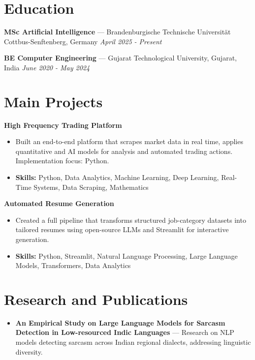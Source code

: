\documentclass[a4paper,10pt]{article}
\begin{document}
\section*{Education}
\textbf{MSc Artificial Intelligence} — Brandenburgische Technische Universität Cottbus-Senftenberg, Germany \hfill \textit{April 2025 - Present}\par
\vspace{1.5pt}
\textbf{BE Computer Engineering} — Gujarat Technological University, Gujarat, India \hfill \textit{June 2020 - May 2024}\par

\section*{Main Projects}
\textbf{High Frequency Trading Platform}\par
\vspace{1pt}
\begin{itemize}
  \item Built an end-to-end platform that scrapes market data in real time, applies quantitative and AI models for analysis and automated trading actions. Implementation focus: Python.
  \item \textbf{Skills:} Python, Data Analytics, Machine Learning, Deep Learning, Real-Time Systems, Data Scraping, Mathematics
\end{itemize}
\vspace{3pt}
\textbf{Automated Resume Generation}\par
\vspace{1pt}
\begin{itemize}
  \item Created a full pipeline that transforms structured job-category datasets into tailored resumes using open-source LLMs and Streamlit for interactive generation.
  \item \textbf{Skills:} Python, Streamlit, Natural Language Processing, Large Language Models, Transformers, Data Analytics
\end{itemize}

\section*{Research and Publications}
\begin{itemize}
\item \textbf{An Empirical Study on Large Language Models for Sarcasm Detection in Low-resourced Indic Languages} — Research on NLP models detecting sarcasm across Indian regional dialects, addressing linguistic diversity.
\end{itemize}
\end{document}
